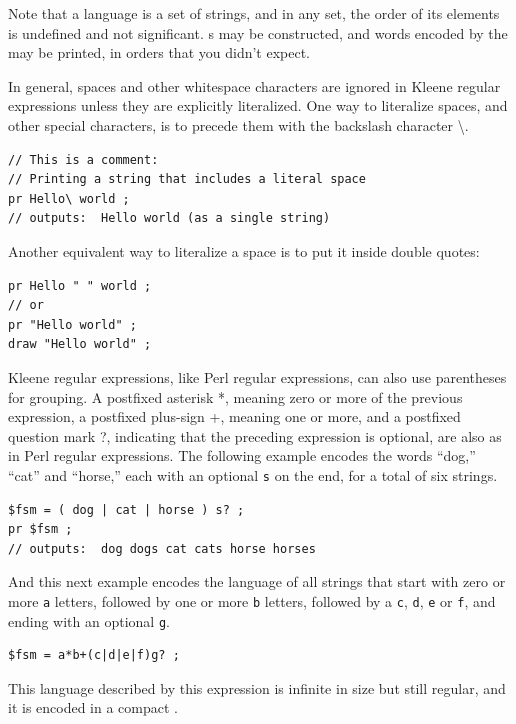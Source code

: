 \noindent
Note that a language is a set of strings, and in any set, the order of its elements 
is undefined and not significant.  \fsm{}s may be constructed, and words encoded by the \fsm{}
may be printed, in orders that you didn't expect.

In general, spaces and other whitespace characters are ignored in Kleene regular
expressions unless they are explicitly literalized.  
One way to literalize spaces, and other
special characters, is to precede them with the backslash character
\textbackslash.

\begin{Verbatim}
// This is a comment:
// Printing a string that includes a literal space
pr Hello\ world ;
// outputs:  Hello world (as a single string)
\end{Verbatim}

\noindent
Another equivalent way to literalize a space is to put it inside double quotes:

\begin{Verbatim}
pr Hello " " world ;
// or
pr "Hello world" ;
draw "Hello world" ;
\end{Verbatim}

Kleene regular expressions, like Perl regular expressions, can also use parentheses for
grouping.  A postfixed asterisk *, meaning zero or more of the previous
expression, a postfixed plus-sign +,
meaning one or more, and a postfixed question mark ?, indicating that the preceding
expression is optional, are also as in Perl regular expressions.
The following example encodes the words ``dog,'' ``cat'' and
``horse,'' each with an optional \texttt{s} on the end, for a total of six strings.

\begin{Verbatim}
$fsm = ( dog | cat | horse ) s? ;
pr $fsm ;
// outputs:  dog dogs cat cats horse horses
\end{Verbatim}

\noindent
And this next example encodes the language of all strings that start with zero or more
\texttt{a} letters, followed by one or more \texttt{b} letters, followed by a
\texttt{c}, \texttt{d}, \texttt{e} or \texttt{f}, and ending with an optional
\texttt{g}.

\begin{Verbatim}
$fsm = a*b+(c|d|e|f)g? ;
\end{Verbatim}

\noindent
This language described by this expression is infinite in size but still regular, and it is
encoded in a compact \fsm{}.


